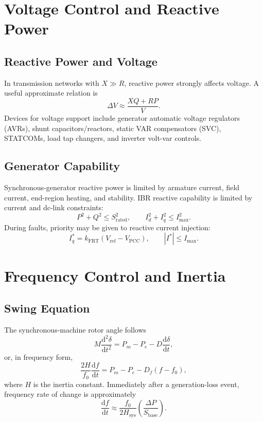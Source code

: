 \documentclass[11pt]{article}
\newcommand{\dd}{\mathrm{d}}
\begin{document}
\section{Voltage Control and Reactive Power}

\subsection{Reactive Power and Voltage}
In transmission networks with $X\gg R$, reactive power strongly affects voltage.
A useful approximate relation is
\begin{equation}
\Delta V\approx \frac{XQ+RP}{V}.
\end{equation}
Devices for voltage support include generator automatic voltage regulators
(AVRs), shunt capacitors/reactors, static VAR compensators (SVC), STATCOMs,
load tap changers, and inverter volt-var controls.

\subsection{Generator Capability}
Synchronous-generator reactive power is limited by armature current, field
current, end-region heating, and stability. IBR reactive capability is limited
by current and dc-link constraints:
\begin{equation}
P^2+Q^2\le S_{\mathrm{rated}}^2, \qquad
I_d^2+I_q^2\le I_{\max}^2.
\end{equation}
During faults, priority may be given to reactive current injection:
\begin{equation}
I_q^{*}=k_{\mathrm{FRT}}\left(V_{\mathrm{ref}}-V_{\mathrm{PCC}}\right),
\qquad |I^*|\le I_{\max}.
\end{equation}

\section{Frequency Control and Inertia}

\subsection{Swing Equation}
The synchronous-machine rotor angle follows
\begin{equation}
M\frac{\dd^2\delta}{\dd t^2}=P_m-P_e-D\frac{\dd \delta}{\dd t},
\end{equation}
or, in frequency form,
\begin{equation}
\frac{2H}{f_0}\frac{\dd f}{\dd t}=P_m-P_e-D_f(f-f_0),
\end{equation}
where $H$ is the inertia constant. Immediately after a generation-loss event,
frequency rate of change is approximately
\begin{equation}
\frac{\dd f}{\dd t}\approx \frac{f_0}{2H_{\mathrm{sys}}}
\left(\frac{\Delta P}{S_{\mathrm{base}}}\right).
\end{equation}
\end{document}
